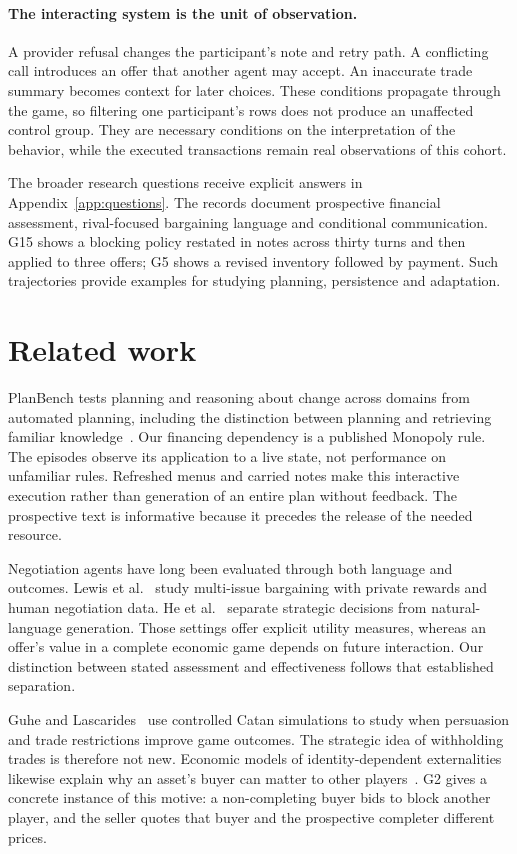 \paragraph{The interacting system is the unit of observation.}
A provider refusal changes the participant's note and retry path. A conflicting call introduces an offer that another agent may accept. An inaccurate trade summary becomes context for later choices. These conditions propagate through the game, so filtering one participant's rows does not produce an unaffected control group. They are necessary conditions on the interpretation of the behavior, while the executed transactions remain real observations of this cohort.

The broader research questions receive explicit answers in Appendix~\ref{app:questions}. The records document prospective financial assessment, rival-focused bargaining language and conditional communication. G15 shows a blocking policy restated in notes across thirty turns and then applied to three offers; G5 shows a revised inventory followed by payment. Such trajectories provide examples for studying planning, persistence and adaptation.

\section{Related work}
PlanBench tests planning and reasoning about change across domains from automated planning, including the distinction between planning and retrieving familiar knowledge~\cite{valmeekam2023planbench}. Our financing dependency is a published Monopoly rule. The episodes observe its application to a live state, not performance on unfamiliar rules. Refreshed menus and carried notes make this interactive execution rather than generation of an entire plan without feedback. The prospective text is informative because it precedes the release of the needed resource.

Negotiation agents have long been evaluated through both language and outcomes. Lewis et al.~\cite{lewis2017deal} study multi-issue bargaining with private rewards and human negotiation data. He et al.~\cite{he2018decoupling} separate strategic decisions from natural-language generation. Those settings offer explicit utility measures, whereas an offer's value in a complete economic game depends on future interaction. Our distinction between stated assessment and effectiveness follows that established separation.

Guhe and Lascarides~\cite{guhe2014persuasion} use controlled Catan simulations to study when persuasion and trade restrictions improve game outcomes. The strategic idea of withholding trades is therefore not new. Economic models of identity-dependent externalities likewise explain why an asset's buyer can matter to other players~\cite{jehiel1996externalities}. G2 gives a concrete instance of this motive: a non-completing buyer bids to block another player, and the seller quotes that buyer and the prospective completer different prices.


